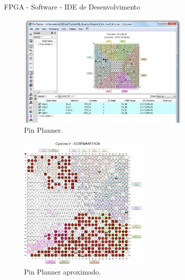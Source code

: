 	\begin{frame}{FPGA - Software - IDE de Desenvolvimento}
		\begin{figure}[p]
			\centering
			\includegraphics[width=0.74\textwidth]{img/fpga/software_quartus_pin.jpg}
			\caption{Pin Planner.}
			\label{fig:alteraquartus_pinagem}
		\end{figure}
	\end{frame}

	\begin{frame}%
		\begin{figure}[p]
			\centering
			\includegraphics[width=0.56\textwidth]{img/fpga/pinplanner.png}
			\caption{Pin Planner aproximado.}
			\label{fig:pinplanner}
		\end{figure}
	\end{frame}

